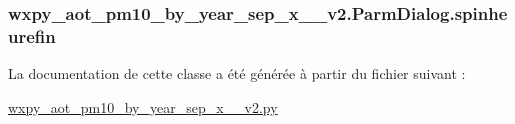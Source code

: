 \hypertarget{classwxpy__aot__pm10__by__year__sep__x__2009__v2_1_1_parm_dialog_a437721aaac31caec2fea2c28450c3ebb}{
\subsubsection[{spinheurefin}]{\setlength{\rightskip}{0pt plus 5cm}wxpy\-\_\-aot\-\_\-pm10\-\_\-by\-\_\-year\-\_\-sep\-\_\-x\-\_\-\_\-v2.\-Parm\-Dialog.\-spinheurefin}}\label{classwxpy__aot__pm10__by__year__sep__x__2009__v2_1_1_parm_dialog_a437721aaac31caec2fea2c28450c3ebb}


La documentation de cette classe a été générée à partir du fichier suivant \-:\begin{DoxyCompactItemize}
\item 
\hyperlink{wxpy__aot__pm10__by__year__sep__x__2009__v2_8py}{wxpy\-\_\-aot\-\_\-pm10\-\_\-by\-\_\-year\-\_\-sep\-\_\-x\-\_\-\_\-v2.\-py}\end{DoxyCompactItemize}

